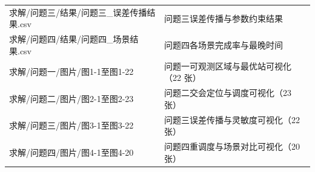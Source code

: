 \begin{longtable}{>{\centering\arraybackslash}p{}>{\raggedright\arraybackslash}p{}}
  求解/\allowbreak{}问题三/\allowbreak{}结果/\allowbreak{}问题三\_\allowbreak{}误差传播结果.csv & 问题三误差传播与参数约束结果 \\
  求解/\allowbreak{}问题四/\allowbreak{}结果/\allowbreak{}问题四\_\allowbreak{}场景结果.csv & 问题四各场景完成率与最晚时间 \\
  求解/\allowbreak{}问题一/\allowbreak{}图片/\allowbreak{}图1-1至图1-22 & 问题一可观测区域与最优站可视化（22 张） \\
  求解/\allowbreak{}问题二/\allowbreak{}图片/\allowbreak{}图2-1至图2-23 & 问题二交会定位与调度可视化（23 张） \\
  求解/\allowbreak{}问题三/\allowbreak{}图片/\allowbreak{}图3-1至图3-22 & 问题三误差传播与灵敏度可视化（22 张） \\
  求解/\allowbreak{}问题四/\allowbreak{}图片/\allowbreak{}图4-1至图4-20 & 问题四重调度与场景对比可视化（20 张） \\
\end{longtable}
